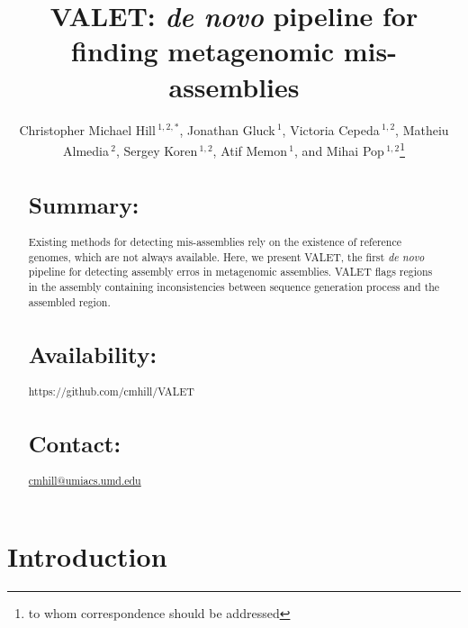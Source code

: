 \documentclass{bioinfo}
\begin{document}

\title[VALET]{VALET: \emph{de novo} pipeline for finding metagenomic mis-assemblies}
\author[Hill \textit{et~al}]{Christopher Michael Hill\,$^{1,2,*}$, Jonathan Gluck\,$^{1}$, Victoria Cepeda\,$^{1,2}$, Matheiu Almedia\,$^{2}$, Sergey Koren\,$^{1,2}$, Atif Memon\,$^{1}$, and Mihai Pop\,$^{1,2}$\footnote{to whom correspondence should be addressed}}
\address{$^{1}$Department of Computer Science,
University of Maryland, College Park, Maryland, 20742
USA\\ $^{2}$ Center
for Bioinformatics and Computational Biology, University of
Maryland, College Park, Maryland, 20742 USA.}



\maketitle

\begin{abstract}

\section{Summary:}
Existing methods for detecting mis-assemblies rely on the existence of reference genomes, which are not always available.
Here, we present VALET, the first \emph{de novo} pipeline for detecting assembly erros in metagenomic assemblies.
VALET flags regions in the assembly containing inconsistencies between sequence generation process and the assembled region.
\section{Availability:}
https://github.com/cmhill/VALET
\section{Contact:} \href{cmhill@umiacs.umd.edu}{cmhill@umiacs.umd.edu}
\end{abstract}

\section{Introduction}
\end{document}
